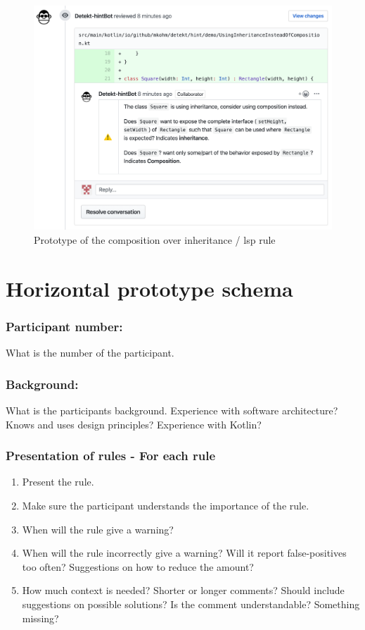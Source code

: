 \begin{figure}[h!]
    \centering
    \includegraphics[width=\textwidth]{../images/demo.png}
    \caption{Prototype of the composition over inheritance / \gls{lsp} rule}
    \label{fig:liskov}
\end{figure}

\clearpage

\section{Horizontal prototype schema}
\subsubsection*{Participant number:} What is the number of the participant.
\subsubsection*{Background:} What is the participants background. Experience with software architecture? Knows and uses design principles? Experience with Kotlin?
\subsubsection*{Presentation of rules - For each rule}
\begin{enumerate}
    \item Present the rule. 
    \item Make sure the participant understands the importance of the rule.
    \item When will the rule give a warning?
    \item When will the rule incorrectly give a warning? Will it report false-positives too often? Suggestions on how to reduce the amount?
    \item How much context is needed? Shorter or longer comments? Should include suggestions on possible solutions? Is the comment understandable? Something missing?
\end{enumerate}

